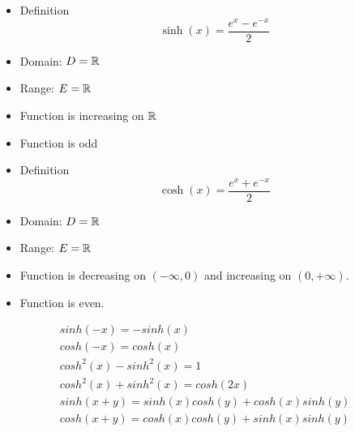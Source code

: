             \begin{itemize}
                \item Definition
                    \begin{equation}
                        \sinh(x) = \dfrac{e^{x} - e^{-x}}{2}
                    \end{equation}
                \item Domain: $D = \mathbb{R}$
                \item Range: $E = \mathbb{R}$
                \item Function is increasing on $\mathbb{R}$
                \item Function is odd
            \end{itemize}
            \begin{itemize}
                \item Definition
                    \begin{equation}
                        \cosh(x) = \dfrac{e^{x} + e^{-x}}{2}
                    \end{equation}
                \item Domain: $D = \mathbb{R}$
                \item Range: $E = \mathbb{R}$
                \item Function is decreasing on $(- \infty, 0)$ and increasing on $(0, + \infty)$.
                \item Function is even.
            \end{itemize}
            \begin{align}
                sinh(-x) = -sinh(x) \\
                cosh(-x) = cosh(x) \\
                cosh^{2}(x) - sinh^{2}(x) = 1 \\
                cosh^{2}(x) + sinh^{2}(x) = cosh(2x) \\
                sinh(x + y) = sinh(x)cosh(y) + cosh(x)sinh(y) \\
                cosh(x + y) = cosh(x)cosh(y) + sinh(x)sinh(y)
            \end{align}
    \hiiEND
